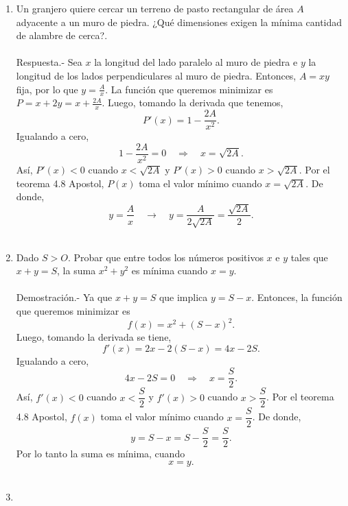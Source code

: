 \begin{enumerate}[\bfseries 1.]
    \item Un granjero quiere cercar un terreno de pasto rectangular de área $A$ adyacente a un muro de piedra. ¿Qué dimensiones exigen la mínima cantidad de alambre de cerca?.\\\\
	Respuesta.-\; Sea $x$ la longitud del lado paralelo al muro de piedra e $y$ la longitud de los lados perpendiculares al muro de piedra. Entonces, $A = xy$ fija, por lo que $y = \frac{A}{x}$. La función que queremos minimizar es $P = x + 2y = x + \frac{2A}{x}$. Luego, tomando la derivada que tenemos,
	$$P'(x)=1-\dfrac{2A}{x^2}.$$
	Igualando a cero,
	$$1-\dfrac{2A}{x^2}=0\quad \Rightarrow \quad x=\sqrt{2A}.$$
	Así, $P'(x)<0$ cuando $x<\sqrt{2A}$ y $P'(x)>0$ cuando $x>\sqrt{2A}$. Por el teorema 4.8 Apostol, $P(x)$ toma el valor mínimo cuando $x=\sqrt{2A}$. De donde,
	$$y=\dfrac{A}{x}\quad \rightarrow \quad y=\dfrac{A}{2\sqrt{2A}}=\dfrac{\sqrt{2A}}{2}.$$\\

    \item Dado $S > O$. Probar que entre todos los números positivos $x$ e $y$ tales que $x + y = S$, la suma $x^2 + y^2$ es mínima cuando $x=y$.\\\\
	Demostración.-\;  Ya que $x+y=S$ que implica $y=S-x$. Entonces, la función que queremos minimizar es 
	$$f(x)=x^2+(S-x)^2.$$ 
	Luego, tomando la derivada se tiene,
	$$f'(x)=2x-2(S-x)=4x-2S.$$
	Igualando a cero,
	$$4x-2S=0\quad \Rightarrow \quad x=\dfrac{S}{2}.$$
	Así, $f'(x)<0$ cuando $x<\dfrac{S}{2}$ y $f'(x)>0$ cuando $x>\dfrac{S}{2}$. Por el teorema 4.8 Apostol, $f(x)$ toma el valor mínimo cuando $x=\dfrac{S}{2}$. De donde,
	$$y=S-x=S-\dfrac{S}{2}=\dfrac{S}{2}.$$
	Por lo tanto la suma es mínima, cuando 
	$$x=y.$$\\

    \item 


\end{enumerate}



